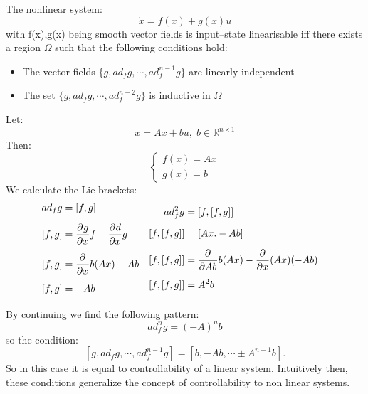 \thm{}
{
    The nonlinear system:
    \begin{equation}
        \dot{x} = f(x) + g(x)u
    \end{equation}
    with f(x),g(x) being smooth vector fields is input--state linearisable iff there exists a region $\Omega$ such that the following
    conditions hold:
    \begin{itemize}
        \item The vector fields $\{g, ad_fg,\cdots ,ad^{n-1}_fg\}$ are linearly independent
        \item The set $\{g, ad_fg,\cdots ,ad^{n-2}_fg\}$ is inductive in $\Omega$
    \end{itemize}
    \ex{}
    {
        Let:
        \begin{equation}
            \dot{x} = Ax+bu, \; b\in \mathbb{R}^{n\times1}
        \end{equation}
        Then:
        \begin{equation}
            \begin{cases}
                f(x) = Ax\\
                g(x) = b
            \end{cases}
        \end{equation}
        We calculate the Lie brackets:
        \begin{equation}
            \begin{aligned}
                ad_fg&=[f,g]&\mbox{}\\[1.25ex]
                [f,g]&= \pdv{g}{x}f - \pdv{d}{x}g&\mbox{}\\[1.25ex]
                [f,g]&= \pdv{}{x}b(Ax) - Ab&\mbox{}\\[1.25ex]
                [f,g]&=-Ab&\mbox{}\\[1.25ex]
            \end{aligned}
            \begin{aligned}
                ad_f^{2}g&=[f,[f,g]]&\mbox{}\\[1.25ex]
                [f,[f,g]]&=[Ax. -Ab]&\mbox{}\\[1.25ex]
                [f,[f,g]]&= \pdv{}{Ab}b(Ax) - \pdv{}{x}(Ax)(-Ab)&\mbox{}\\[1.25ex]
                [f,[f,g]]&=A^{2}b&\mbox{}\\[1.25ex]
            \end{aligned}

        \end{equation}
        By continuing we find the following pattern:
        \begin{equation}
            ad_f^{n}g=(-A)^{n}b
        \end{equation}
        so the condition:
        \[
            [g,ad_fg,\cdots ,ad_f^{n-1}g] = [b, -Ab, \cdots \pm A^{n-1}b]
        .\] 
        So in this case it is equal to controllability of a linear system.
        Intuitively then, these conditions generalize the concept of controllability to non linear systems.
    }

}






